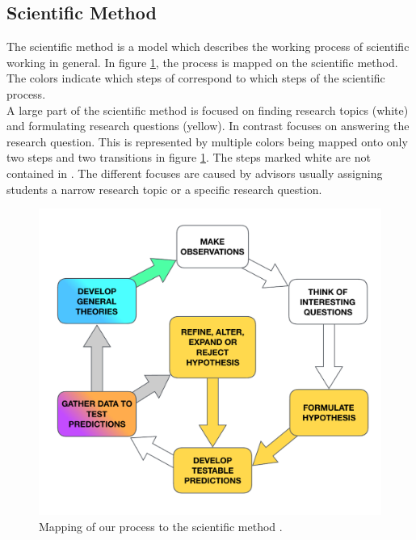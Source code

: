
\subsection {Scientific Method}
\label{subsec:scientific method}

The scientific method is a model which describes the working process of scientific working in general. In figure \ref{fig:SCIENTIFIC_METHOD}, the \checklist{} process is mapped on the scientific method. The colors indicate which steps of \checklist{} correspond to which steps of the scientific process. \\
A large part of the scientific method is focused on finding research topics (white) and formulating research questions (yellow). In contrast \checklist{} focuses on answering the research question. This is represented by multiple colors being mapped onto only two steps and two transitions in figure  \ref{fig:SCIENTIFIC_METHOD}. The steps marked white are not contained in \checklist{}.
The different focuses are caused by advisors usually assigning students a narrow research topic or a specific research question.

\begin{figure}
	\centering
	\includegraphics[width=12cm]{figures/scientific_method_mapping.pdf}
	\caption{Mapping of our process to the scientific method \cite{ScienceMethod}.}
	\label{fig:SCIENTIFIC_METHOD}
\end{figure}


